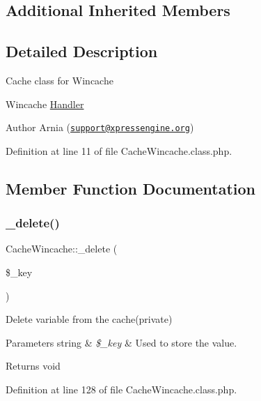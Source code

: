 \subsection*{Additional Inherited Members}


\subsection{Detailed Description}
Cache class for Wincache

Wincache \hyperlink{classHandler}{Handler}

\begin{DoxyAuthor}{Author}
Arnia (\href{mailto:support@xpressengine.org}{\tt support@xpressengine.\+org}) 
\end{DoxyAuthor}


Definition at line 11 of file Cache\+Wincache.\+class.\+php.



\subsection{Member Function Documentation}
\hypertarget{classCacheWincache_ab20145a0ee5672f182b6da797c80b77a}{}\label{classCacheWincache_ab20145a0ee5672f182b6da797c80b77a} 
\subsubsection{\texorpdfstring{\+\_\+delete()}{\_delete()}}
{\footnotesize\ttfamily Cache\+Wincache\+::\+\_\+delete (\begin{DoxyParamCaption}\item[{}]{\$\+\_\+key }\end{DoxyParamCaption})}

Delete variable from the cache(private)


\begin{DoxyParams}[1]{Parameters}
string & {\em \$\+\_\+key} & Used to store the value. \\
\hline
\end{DoxyParams}
\begin{DoxyReturn}{Returns}
void 
\end{DoxyReturn}


Definition at line 128 of file Cache\+Wincache.\+class.\+php.

\hypertarget{classCacheWincache_a564e8c74dc22b1e84a0d1cfd6d0d935e}{}\label{classCacheWincache_a564e8c74dc22b1e84a0d1cfd6d0d935e} 
